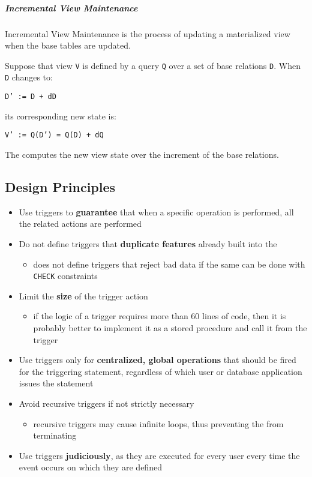 \documentclass[english]{article}
\begin{document}
\subparagraph*{Incremental View Maintenance}
Incremental View Maintenance is the process of updating a materialized view when the base tables are updated.

Suppose that view \texttt{V} is defined by a query \texttt{Q} over a set of base relations \texttt{D}.
When \texttt{D} changes to:
\begin{center}
  \texttt{D' := D + dD}
\end{center}
its corresponding new state is:
\begin{center}
  \texttt{V' := Q(D') = Q(D) + dQ}
\end{center}
The \dbms computes the new view state over the increment of the base relations.

\subsection{Design Principles}

\begin{itemize}
  \item Use triggers to \textbf{guarantee} that when a specific operation is performed, all the related actions are performed
  \item Do not define triggers that \textbf{duplicate features} already built into the \dbms
        \begin{itemize}[label=\(\rightarrow\)]
          \item does not define triggers that reject bad data if the same can be done with \sql \texttt{CHECK} constraints
        \end{itemize}
  \item Limit the \textbf{size} of the trigger action
        \begin{itemize}[label=\(\rightarrow\)]
          \item if the logic of a trigger requires more than \(60\) lines of code, then it is probably better to implement it as a stored procedure and call it from the trigger
        \end{itemize}
  \item Use triggers only for \textbf{centralized, global operations} that should be fired for the triggering statement, regardless of which user or database application issues the statement
  \item Avoid recursive triggers if not strictly necessary
        \begin{itemize}[label=\(\rightarrow\)]
          \item recursive triggers may cause infinite loops, thus preventing the \dbms from terminating
        \end{itemize}
  \item Use triggers \textbf{judiciously}, as they are executed for every user every time the event occurs on which they are defined
\end{itemize}
\end{document}
